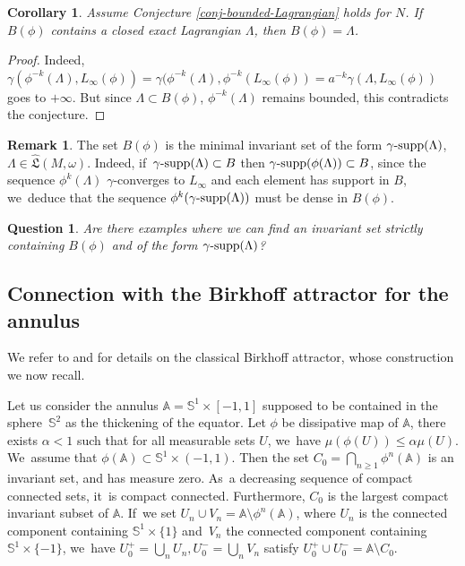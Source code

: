 \documentclass[10pt]{amsart}
\newtheorem{cor}[thm]{Corollary}
\newtheorem{Question}[thm]{Question}
\theoremstyle{definition}
\newtheorem{rem}[thm]{Remark}
\DeclareMathOperator{\gammasupp}{\gamma\textup{-supp}}
\newcommand{\fL}{\mathfrak {L}}
\newcommand{\hatL}{\widehat{\fL}}
\begin{document}
\begin{cor} Assume Conjecture \ref{conj-bounded-Lagrangian} holds for $N$. If~$B(\phi)$ contains a closed exact Lagrangian $\Lambda$, then $B(\phi)=\Lambda$.
\end{cor}
\begin{proof}
Indeed, $\gamma(\phi^{-k}(\Lambda), L_\infty(\phi))=\gamma(\phi^{-k}(\Lambda), \phi^{-k}(L_\infty(\phi)) =a^{-k} \gamma(\Lambda, L_\infty(\phi)) $ goes to $+\infty$. But since $\Lambda \subset B(\phi)$, $\phi^{-k}(\Lambda)$ remains bounded, this contradicts the conjecture.
\end{proof}

\begin{rem}
The set
$B(\phi)$ is the minimal invariant set of the form
$\gammasupp(\Lambda)$, $\Lambda\in \hatL(M,\omega)$. Indeed, if~$\gammasupp(\Lambda) \subset B$
then $\gammasupp(\phi(\Lambda))\subset B$, since the sequence $\phi^k(\Lambda)$
$\gamma$\nobreakdash-converges to $L_\infty$ and each element has support in $B$, we~deduce that the sequence
$ \phi^k (\gammasupp(\Lambda))$ must be dense in $B(\phi)$.
\begin{Question}
Are there examples where we can find an invariant set strictly containing $B(\phi)$ and of the form $\gammasupp(\Lambda)$?
\end{Question}
\end{rem}

\subsection{Connection with the Birkhoff attractor for the annulus}\label{sec:connection-Birkhoff}
We refer to \cite{LeCalvez-Birkhoff1} and \cite{LeCalvez-Birkhoff2} for details on the classical Birkhoff attractor, whose construction we now recall.

Let us consider the annulus $\mathbb A= {\mathbb S}^{1}\times [-1,1]$ supposed to be contained in the sphere~$\mathbb S^{2}$ as the thickening of the equator. Let $\phi$ be dissipative map of $\mathbb A$, \ie there exists $\alpha<1$ such that for all measurable sets $U$, we~have $\mu (\phi(U))\leq \alpha \mu(U)$. We~assume that $\phi(\mathbb A)\subset {\mathbb S}^{1}\times (-1,1)$.
Then the set $C_{0}=\bigcap_{n\geq 1}\phi^{n}(\mathbb A)$ is an invariant set, and has measure zero. As~a decreasing sequence of compact connected sets, it~is compact connected. Furthermore, $C_0$ is the largest compact invariant subset of $\mathbb A$. If~we set $U_{n}\cup V_{n}= \mathbb A \setminus \phi^{n}(\mathbb A)$, where $U_{n}$ is the connected component containing $\mathbb S^{1} \times \{1\}$ and~$V_{n}$ the connected component containing $\mathbb S^{1} \times \{-1\}$, we~have $U_{0}^+=\bigcup_{n}U_{n}, U^{-}_{0}= \bigcup_{n}V_{n}$ satisfy $U_{0}^{+}\cup U^{-}_{0}=\mathbb A\setminus C_{0}$.
\end{document}

